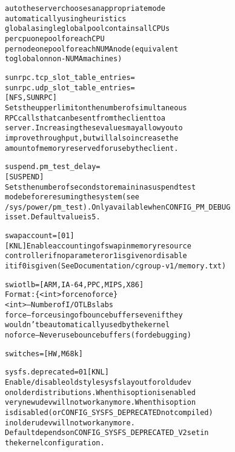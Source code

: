 \documentclass[a4paper,8pt,english]{sphinxmanual}
\begin{document}
\begin{alltt}
                        auto        the server chooses an appropriate mode
                                    automatically using heuristics
                        global      a single global pool contains all CPUs
                        percpu      one pool for each CPU
                        pernode     one pool for each NUMA node (equivalent
                                    to global on non-NUMA machines)

        sunrpc.tcp\_slot\_table\_entries=
        sunrpc.udp\_slot\_table\_entries=
                        {[}NFS,SUNRPC{]}
                        Sets the upper limit on the number of simultaneous
                        RPC calls that can be sent from the client to a
                        server. Increasing these values may allow you to
                        improve throughput, but will also increase the
                        amount of memory reserved for use by the client.

        suspend.pm\_test\_delay=
                        {[}SUSPEND{]}
                        Sets the number of seconds to remain in a suspend test
                        mode before resuming the system (see
                        /sys/power/pm\_test). Only available when CONFIG\_PM\_DEBUG
                        is set. Default value is 5.

        swapaccount={[}0\textbar{}1{]}
                        {[}KNL{]} Enable accounting of swap in memory resource
                        controller if no parameter or 1 is given or disable
                        it if 0 is given (See Documentation/cgroup-v1/memory.txt)

        swiotlb=        {[}ARM,IA-64,PPC,MIPS,X86{]}
                        Format: \{ \textless{}int\textgreater{} \textbar{} force \textbar{} noforce \}
                        \textless{}int\textgreater{} -- Number of I/O TLB slabs
                        force -- force using of bounce buffers even if they
                                 wouldn't be automatically used by the kernel
                        noforce -- Never use bounce buffers (for debugging)

        switches=       {[}HW,M68k{]}

        sysfs.deprecated=0\textbar{}1 {[}KNL{]}
                        Enable/disable old style sysfs layout for old udev
                        on older distributions. When this option is enabled
                        very new udev will not work anymore. When this option
                        is disabled (or CONFIG\_SYSFS\_DEPRECATED not compiled)
                        in older udev will not work anymore.
                        Default depends on CONFIG\_SYSFS\_DEPRECATED\_V2 set in
                        the kernel configuration.


\end{alltt}
\end{document}
